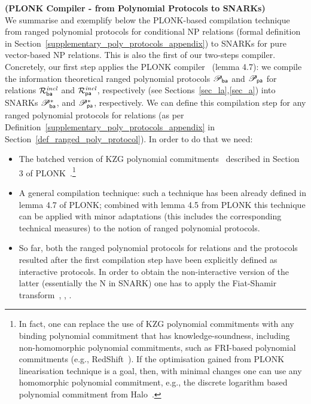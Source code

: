 \noindent \textbf{(PLONK Compiler - from Polynomial Protocols to SNARKs)} \\

\noindent We summarise and exemplify below the PLONK-based compilation technique~\cite{plonk} from 
ranged polynomial protocols for conditional NP relations (formal definition in Section~\ref{supplementary_poly_protocols_appendix}) to 
SNARKs for pure vector-based NP relations. This is also the first of our two-steps compiler. Concretely, our first step applies the PLONK compiler~\cite{plonk} (lemma 4.7): 
we compile the information theoretical ranged polynomial protocols $\mathscr{P}_{\mathsf{ba}}$ and $\mathscr{P}_{\mathsf{pa}}$ for relations $\mathcal{R}^{\mathit{incl}}_{\mathsf{ba}}$ and $\mathcal{R}^{\mathit{incl}}_{\mathsf{pa}}$, respectively (see Sections~\ref{sec_la},\ref{sec_a}) 
into SNARKs $\mathscr{P}_{\mathsf{ba}}^{\ast}$, and $\mathscr{P}_{\mathsf{pa}}^{\ast}$, respectively. We can define this compilation step for any ranged polynomial protocols for relations 
(as per Definition~\ref{supplementary_poly_protocols_appendix} in Section~\ref{def_ranged_poly_protocol}). In order to do that we need: 
\begin{itemize}
\item  The batched version of KZG polynomial commitments~\cite{KZG_10} described in Section 3 of PLONK~\cite{plonk}.\footnote{In fact, 
one can replace the use of KZG polynomial commitments with any binding polynomial commitment that has knowledge-soundness, including non-homomorphic polynomial commitments, 
such as FRI-based polynomial commitments (e.g., RedShift~\cite{redshift}). If the optimisation gained from PLONK linearisation technique is a goal, 
then, with minimal changes one can use any homomorphic polynomial commitment, e.g., the discrete logarithm based polynomial commitment 
from Halo~\cite{halo}.}
\item A general compilation technique: such a technique has been already defined in lemma 4.7 of PLONK; combined with lemma 4.5 
from PLONK this technique can be applied with minor adaptations (this includes the corresponding technical measures) to the notion of ranged 
polynomial protocols.  
\item So far, both the ranged polynomial protocols for relations and the protocols resulted after the first compilation step have been explicitly defined as interactive 
protocols. In order to obtain the non-interactive version of the latter (essentially the N in SNARK) one has to apply the Fiat-Shamir 
transform~\cite{FS_transform}, \cite{FS_transform_with_proof}, \cite{SE_plonk}.
\end{itemize}


